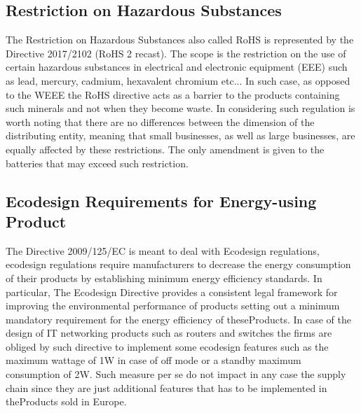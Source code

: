 \documentclass{article}
\begin{document}
\subsection{Restriction on Hazardous Substances}
  The Restriction on Hazardous Substances also called RoHS is represented by the Directive 2017/2102 (RoHS 2 recast). The scope is the restriction on the use of certain hazardous substances in electrical and electronic equipment (EEE) such as lead, mercury, cadmium, hexavalent chromium etc... In such case, as opposed to the WEEE the RoHS directive acts as a barrier to the products containing such minerals and not when they become waste. In considering such regulation is worth noting that there are no differences between the dimension of the distributing entity, meaning that small businesses, as well as large businesses, are equally affected by these restrictions. The only amendment is given to the batteries that may exceed such restriction.

\subsection{Ecodesign Requirements for Energy-using Product}
  The Directive 2009/125/EC is meant to deal with Ecodesign regulations, ecodesign regulations require manufacturers to decrease the energy consumption of their products by establishing minimum energy efficiency standards. In particular, The Ecodesign Directive provides a consistent legal framework for improving the environmental performance of products setting out a minimum mandatory requirement for the energy efficiency of theseProducts. In case of the design of IT networking products such as routers and switches the firms are obliged by such directive to implement some ecodesign features such as the maximum wattage of 1W in case of off mode or a standby maximum consumption of 2W. Such measure per se do not impact in any case the supply chain since they are just additional features that has to be implemented in theProducts sold in Europe.
\end{document}

